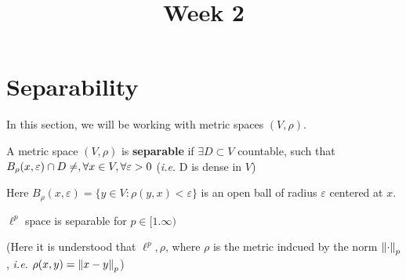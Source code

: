 \documentclass{article}
\title{Week 2}
\begin{document}
\maketitle


\section{Separability}  

In this section, we will be working with metric spaces \((V, \rho)\).

\begin{definition}[Separable]
	A metric space $(V,\rho)$ is \textbf{separable} if \(\exists D \subset V\) countable, 
	such that \(B_{\rho}(x, \varepsilon) \cap D \neq \empty, \forall x \in V, \forall \varepsilon >0\) 
	(\textit{i.e.} D is dense in \(V\))
\end{definition}

Here \(B_{\rho}(x, \varepsilon)=\{y \in V: \rho (y,x) < \varepsilon\}\) is an open ball of radius \(\varepsilon\) 
centered at \(x\).

\begin{proposition}
	\(\ell^p\) space is separable for \(p \in [1. \infty)\)
\end{proposition}  
(Here it is understood that \(\ell^p, \rho\), where \(\rho\) is the metric indcued by the norm \(\left\|{\cdot}\right\|_p\), 
\textit{i.e.} \(\rho(x,y)=\left\|{x-y}\right\|_p\))  
\end{document}
